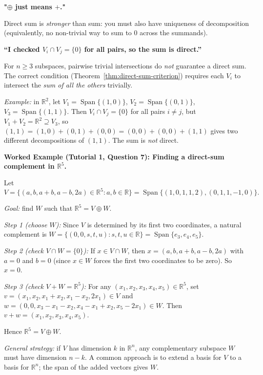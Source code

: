 \begin{commonmistake}

\textbf{"$\oplus$ just means $+$."}\

Direct sum is \emph{stronger} than sum: you must also have uniqueness of decomposition (equivalently, no non-trivial way to sum to $0$ across the summands).

\end{commonmistake}

\begin{commonmistake}
\textbf{``I checked $V_i\cap V_j=\{0\}$ for all pairs, so the sum is direct.''}

For $n\ge 3$ subspaces, pairwise trivial intersections do \emph{not} guarantee a direct sum.  The correct condition (Theorem~\ref{thm:direct-sum-criterion}) requires each $V_i$ to intersect the \emph{sum of all the others} trivially.

\medskip
\emph{Example:} in $\mathbb{R}^2$, let $V_1=\operatorname{Span}\{(1,0)\}$, $V_2=\operatorname{Span}\{(0,1)\}$, $V_3=\operatorname{Span}\{(1,1)\}$.  Then $V_i\cap V_j=\{0\}$ for all pairs $i\neq j$, but $V_1+V_2=\mathbb{R}^2\supseteq V_3$, so $(1,1)=(1,0)+(0,1)+(0,0)=(0,0)+(0,0)+(1,1)$ gives two different decompositions of $(1,1)$.  The sum is \emph{not} direct.
\end{commonmistake}

\begin{examplebox}
\textbf{Worked Example (Tutorial 1, Question 7): Finding a direct-sum complement in $\mathbb{R}^5$.}

Let
\[
V=\{(a,b,a+b,a-b,2a)\in\mathbb{R}^5 : a,b\in\mathbb{R}\}=\operatorname{Span}\{(1,0,1,1,2),(0,1,1,-1,0)\}.
\]

\emph{Goal:} find $W$ such that $\mathbb{R}^5=V\oplus W$.

\emph{Step 1 (choose $W$):}  Since $V$ is determined by its first two coordinates, a natural complement is $W=\{(0,0,s,t,u):s,t,u\in\mathbb{R}\}=\operatorname{Span}\{e_3,e_4,e_5\}$.

\emph{Step 2 (check $V\cap W=\{0\}$):}  If $x\in V\cap W$, then $x=(a,b,a+b,a-b,2a)$ with $a=0$ and $b=0$ (since $x\in W$ forces the first two coordinates to be zero).  So $x=0$.

\emph{Step 3 (check $V+W=\mathbb{R}^5$):}  For any $(x_1,x_2,x_3,x_4,x_5)\in\mathbb{R}^5$, set $v=(x_1,x_2,x_1+x_2,x_1-x_2,2x_1)\in V$ and $w=(0,0,x_3-x_1-x_2,x_4-x_1+x_2,x_5-2x_1)\in W$.  Then $v+w=(x_1,x_2,x_3,x_4,x_5)$.

Hence $\mathbb{R}^5=V\oplus W$.

\medskip
\emph{General strategy:}  if $V$ has dimension $k$ in $\mathbb{R}^n$, any complementary subspace $W$ must have dimension $n-k$.  A common approach is to extend a basis for $V$ to a basis for $\mathbb{R}^n$; the span of the added vectors gives $W$.
\end{examplebox}


